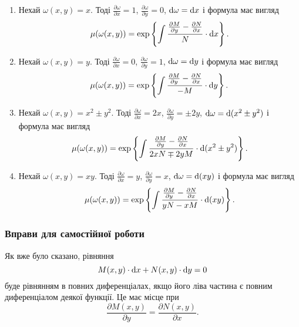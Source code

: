 \begin{enumerate}
	\item Нехай $\omega(x, y) = x$. Тоді $\frac{\partial \omega}{\partial x} = 1$, $\frac{\partial \omega}{\partial y} = 0$, $\mathop{}\!\mathrm{d} \omega = \mathop{}\!\mathrm{d} x$ і формула має вигляд
	\begin{equation*}
		\mu(\omega(x,y)) = \exp\left\{\int \frac{\frac{\partial M}{\partial y} - \frac{\partial N}{\partial x} }{N} \cdot \mathop{}\!\mathrm{d} x\right\}.
	\end{equation*}	
	\item Нехай $\omega(x, y) = y$. Тоді $\frac{\partial \omega}{\partial x} = 0$, $\frac{\partial \omega}{\partial y} = 1$, $\mathop{}\!\mathrm{d} \omega = \mathop{}\!\mathrm{d} y$ і формула має вигляд
	\begin{equation*}
		\mu(\omega(x,y)) = \exp\left\{\int \frac{\frac{\partial M}{\partial y} - \frac{\partial N}{\partial x} }{-M} \cdot \mathop{}\!\mathrm{d} y\right\}.
	\end{equation*}
	\item Нехай $\omega(x, y) = x^2 \pm y^2$. Тоді $\frac{\partial \omega}{\partial x} = 2 x$, $\frac{\partial \omega}{\partial y} = \pm 2y$, $\mathop{}\!\mathrm{d} \omega = \mathop{}\!\mathrm{d} (x^2 \pm y^2)$ і формула має вигляд
	\begin{equation*}
		\mu(\omega(x,y)) = \exp\left\{\int \frac{\frac{\partial M}{\partial y} - \frac{\partial N}{\partial x} }{2 x N \mp 2 y M} \cdot \mathop{}\!\mathrm{d} (x^2 \pm y^2)\right\}.
	\end{equation*}
	\item Нехай $\omega(x, y) = x y$. Тоді $\frac{\partial \omega}{\partial x} = y$, $\frac{\partial \omega}{\partial y} = x$, $\mathop{}\!\mathrm{d} \omega = \mathop{}\!\mathrm{d} (xy)$ і формула має вигляд
	\begin{equation*}
		\mu(\omega(x,y)) = \exp\left\{\int \frac{\frac{\partial M}{\partial y} - \frac{\partial N}{\partial x} }{yN-xM} \cdot \mathop{}\!\mathrm{d} (xy)\right\}.
	\end{equation*}
\end{enumerate}

\subsubsection{Вправи для самостійної роботи}
Як вже було сказано, рівняння \[M(x, y) \cdot \mathop{}\!\mathrm{d} x + N(x, y) \cdot \mathop{}\!\mathrm{d} y = 0\] буде рівнянням в повних диференціалах, якщо його ліва частина є повним диференціалом деякої функції. Це має місце при \[\frac{\partial M(x, y)}{\partial y} = \frac{\partial N(x, y)}{\partial x}.\]

